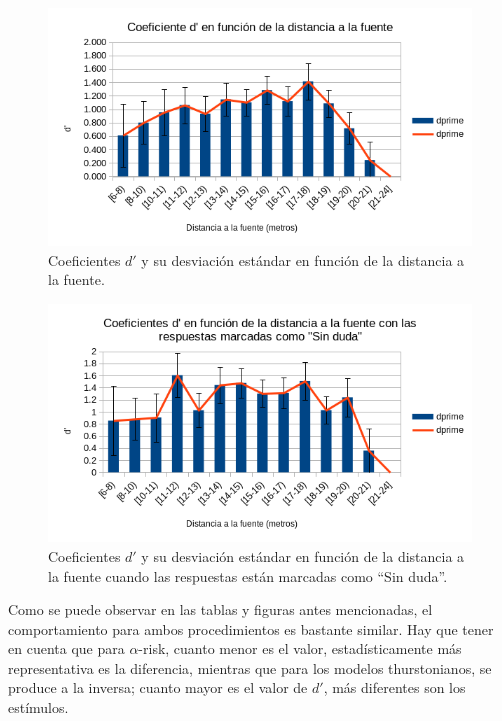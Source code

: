\documentclass[11pt,a4paper,twoside]{book}
\begin{document}
		    \begin{figure}[H]
                \includegraphics[scale=0.7]{../imagenes/analisisThurstFuenteDuda.png}
			    \centering
			    \caption{Coeficientes $d'$ y su desviación estándar en función de la distancia a la fuente.} 
			    \label{fig:ThurstFuenteDuda}
            \end{figure}
            
            \begin{figure}[H]
                \includegraphics[scale=0.7]{../imagenes/analisisThurstFuenteSinDuda.png}
			    \centering
			    \caption{Coeficientes $d'$ y su desviación estándar en función de la distancia a la fuente cuando las respuestas están marcadas como ``Sin duda''.} 
			    \label{fig:ThurstFuenteSinDuda}
            \end{figure}

            Como se puede observar en las tablas y figuras antes mencionadas, el comportamiento para ambos procedimientos es bastante similar. Hay que tener en cuenta que para $\alpha$-risk, cuanto menor es el valor, estadísticamente más representativa es la diferencia, mientras que para los modelos thurstonianos, se produce a la inversa; cuanto mayor es el valor de $d'$, más diferentes son los estímulos.
            
\end{document}
